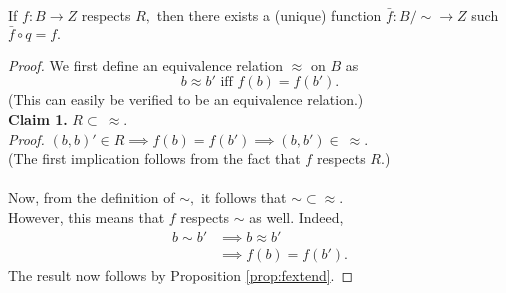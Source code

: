 \begin{prop} \label{prop:fextends2}
	If $f:B\to Z$ respects $R,$ then there exists a (unique) function $\bar{f}:B/{\sim} \to Z$ such $\bar{f}\circ q = f.$
\end{prop}
\begin{proof} 
	We first define an equivalence relation $\approx$ on $B$ as 
	\begin{equation*} 
		b \approx b' \text{ iff } f(b) = f(b').
	\end{equation*}
	(This can easily be verified to be an equivalence relation.)\\
	\textbf{Claim 1.} $R \subset \ \approx.$\\
	\emph{Proof.} $(b, b)' \in R \implies f(b) = f(b') \implies (b, b') \in \ \approx.$ \\
	(The first implication follows from the fact that $f$ respects $R.$)\\~\\
	Now, from the definition of $\sim,$ it follows that ${\sim} \subset {\approx}.$\\
	However, this means that $f$ respects $\sim$ as well. Indeed,
	\begin{align*} 
		b \sim b' &\implies b \approx b'\\
		&\implies f(b) = f(b').
	\end{align*}
	The result now follows by Proposition \ref{prop:fextend}.
\end{proof}